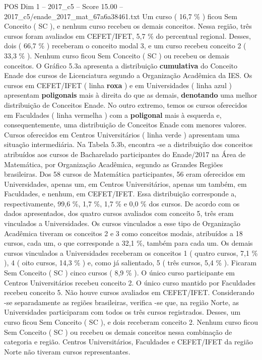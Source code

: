 \begin{textsample}{POS Dim 1 – 2017\_c5 – Score 15.00 – 2017\_c5/enade\_2017\_mat\_67a6a38461.txt}
Um curso ( 16,7 \% ) ficou Sem Conceito ( SC ), e nenhum curso recebeu os demais conceitos.
Nessa região, três cursos foram avaliados em CEFET/IFET, 5,7 \% do percentual regional.
Desses, dois ( 66,7 \% ) receberam o conceito modal 3, e um curso recebeu conceito 2 ( 33,3 \% ).
Nenhum curso ficou Sem Conceito ( SC ) ou recebeu os demais conceitos.
O Gráfico 5.3a apresenta a distribuição \textbf{cumulativa} do Conceito Enade dos cursos de Licenciatura segundo a Organização Acadêmica da IES.
Os cursos em CEFET/IFET ( linha \textbf{roxa} ) e em Universidades ( linha azul ) apresentam \textbf{poligonais} mais à direita do que as demais, \textbf{denotando} uma melhor distribuição de Conceitos Enade.
No outro extremo, temos os cursos oferecidos em Faculdades ( linha vermelha ) com a \textbf{poligonal} mais à esquerda e, consequentemente, uma distribuição de Conceitos Enade com menores valores.
Cursos oferecidos em Centros Universitários ( linha verde ) apresentam uma situação intermediária.
Na Tabela 5.3b, encontra -se a distribuição dos conceitos atribuídos aos cursos de Bacharelado participantes do Enade/2017 na Área de Matemática, por Organização Acadêmica, segundo as Grandes Regiões brasileiras.
Dos 58 cursos de Matemática participantes, 56 eram oferecidos em Universidades, apenas um, em Centros Universitários, apenas um também, em Faculdades, e nenhum, em CEFET/IFET.
Essa distribuição corresponde a, respectivamente, 99,6 \%, 1,7 \%, 1,7 \% e 0,0 \% dos cursos.
De acordo com os dados apresentados, dos quatro cursos avaliados com conceito 5, três eram vinculados a Universidades.
Os cursos vinculados a esse tipo de Organização Acadêmica tiveram os conceitos 2 e 3 como conceitos modais, atribuídos a 18 cursos, cada um, o que corresponde a 32,1 \%, também para cada um.
Os demais cursos vinculados a Universidades receberam os conceitos 1 ( quatro cursos, 7,1 \% ), 4 ( oito cursos, 14,3 \% ) e, como já salientado, 5 ( três cursos, 5,4 \% ).
Ficaram Sem Conceito ( SC ) cinco cursos ( 8,9 \% ).
O único curso participante em Centros Universitários recebeu conceito 2.
O único curso mantido por Faculdades recebeu conceito 5.
Não houve cursos avaliados em CEFET/IFET.
Considerando -se separadamente as regiões brasileiras, verifica -se que, na região Norte, as Universidades participaram com todos os três cursos registrados.
Desses, um curso ficou Sem Conceito ( SC ), e dois receberam conceito 2.
Nenhum curso ficou Sem Conceito ( SC ) ou recebeu os demais conceitos nessa combinação de categoria e região.
Centros Universitários, Faculdades e CEFET/IFET da região Norte não tiveram cursos representantes.

\end{textsample}
